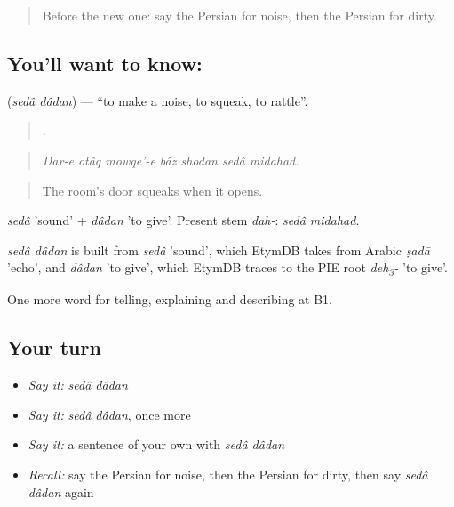 \label{lesson:FA-C440-seda-dadan}



\begin{quote}
Before the new one: say the Persian for noise, then the Persian for dirty.
\end{quote}

\subsection*{You'll want to know:  }
\textbf{ } (\emph{sedâ dâdan}) — \textquotedblleft{}to make a noise, to squeak, to rattle\textquotedblright{}.

\begin{quote}
      .
\end{quote}

\begin{quote}
\emph{Dar-e otâq mowqe'-e bâz shodan sedâ midahad.}
\end{quote}

\begin{quote}
The room's door squeaks when it opens.
\end{quote}

\emph{sedâ} 'sound' + \emph{dâdan} 'to give'. Present stem \emph{dah-}: \emph{sedâ midahad}.

\begin{cousinweb}
\emph{sedâ dâdan} is built from \emph{sedâ} 'sound', which EtymDB takes from Arabic \emph{ṣadā} 'echo', and \emph{dâdan} 'to give', which EtymDB traces to the PIE root \emph{deh\textsubscript{3}-} 'to give'.
\end{cousinweb}

\begin{grammarlens}[title={What you've built}]
One more word for telling, explaining and describing at B1.
\end{grammarlens}

\subsection*{Your turn}
\begin{itemize}
\raggedright
  \item \emph{Say it:} \emph{sedâ dâdan}
  \item \emph{Say it:} \emph{sedâ dâdan}, once more
  \item \emph{Say it:} a sentence of your own with \emph{sedâ dâdan}
  \item \emph{Recall:} say the Persian for noise, then the Persian for dirty, then say \emph{sedâ dâdan} again
\end{itemize}

